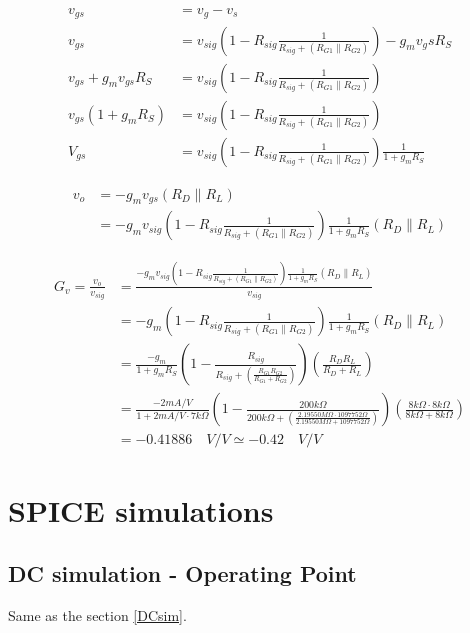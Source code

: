 \documentclass[10pt,a4paper]{book}
\begin{document}
\begin{align}
v_{gs} &= v_g - v_s\\
v_{gs} &= v_{sig} \left(1 - R_{sig} \frac{1}{R_{sig} + (R_{G1} \parallel R_{G2})}\right) - g_m v_gs R_S\\
v_{gs} + g_m v_{gs} R_S &= v_{sig} \left(1 - R_{sig} \frac{1}{R_{sig} + (R_{G1} \parallel R_{G2})}\right)\\
v_{gs} (1+ g_m R_S) &= v_{sig} \left(1 - R_{sig} \frac{1}{R_{sig} + (R_{G1} \parallel R_{G2})}\right)\\
V_{gs} &= v_{sig} \left(1 - R_{sig} \frac{1}{R_{sig} + (R_{G1} \parallel R_{G2})}\right) \frac{1}{1+ g_m R_S}
\end{align}

\begin{align}
v_o &= - g_m v_{gs} (R_D \parallel R_L)\\
&= -g_m v_{sig} \left(1 - R_{sig} \frac{1}{R_{sig} + (R_{G1} \parallel R_{G2})}\right) \frac{1}{1+ g_m R_S} (R_D \parallel R_L)
\end{align}

\begin{align}
G_v = \frac{v_o}{v_{sig}} &= \frac{-g_m v_{sig} \left(1 - R_{sig} \frac{1}{R_{sig} + (R_{G1} \parallel R_{G2})}\right) \frac{1}{1+ g_m R_S} (R_D \parallel R_L)}{v_{sig}}\\
&= -g_m \left(1 - R_{sig} \frac{1}{R_{sig} + (R_{G1} \parallel R_{G2})}\right) \frac{1}{1+ g_m R_S} (R_D \parallel R_L)\\
&= \frac{-g_m}{1+ g_m R_S} \left(1 - \frac{R_{sig}}{R_{sig} + \left(\frac{R_{G1}R_{G2}}{R_{G1}+R_{G2}}\right)}\right) \left(\frac{R_{D}R_{L}}{R_{D}+R_{L}}\right)\\
&= \frac{-2mA/V}{1+ 2mA/V \cdot 7k\Omega} \left(1 - \frac{200k\Omega}{200k\Omega + \left(\frac{2.19550M\Omega \cdot 1097752\Omega}{2.19550M\Omega +1097752\Omega}\right)}\right) \left(\frac{8k\Omega \cdot 8k\Omega}{8k\Omega + 8k\Omega}\right)\\
&= -0.41886 \quad V/V \simeq -0.42 \quad V/V \label{GvNoCs}
\end{align}

\clearpage
\section{SPICE simulations}
\subsection{DC simulation - Operating Point}
Same as the section \ref{DCsim}.
\end{document}
